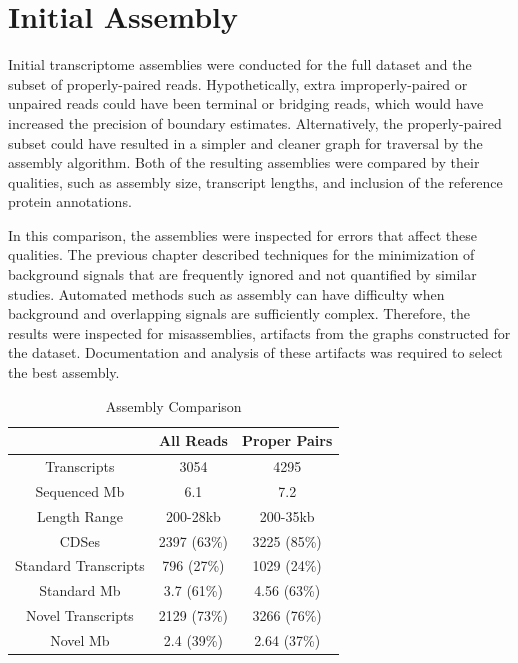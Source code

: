 
\section{Initial Assembly}


Initial transcriptome assemblies were conducted for the full dataset and the subset of properly-paired reads. Hypothetically, extra improperly-paired or unpaired reads could have been terminal or bridging reads, which would have increased the precision of boundary estimates. Alternatively, the properly-paired subset could have resulted in a simpler and cleaner graph for traversal by the assembly algorithm. Both of the resulting assemblies were compared by their qualities, such as assembly size, transcript lengths, and inclusion of the reference protein annotations. 

In this comparison, the assemblies were inspected for errors that affect these qualities. The previous chapter described techniques for the minimization of background signals that are frequently ignored and not quantified by similar studies. Automated methods such as assembly can have difficulty when background and overlapping signals are sufficiently complex. Therefore, the results were inspected for misassemblies, artifacts from the graphs constructed for the dataset. Documentation and analysis of these artifacts was required to select the best assembly.

\begin{table}
\caption{Assembly Comparison}\label{table:assemb_compare}
\begin{center}
\begin{tabular}{|c|c|c|}\hline
  & All Reads & Proper Pairs\\\hline\hline
Transcripts & 3054 & 4295\\\hline
Sequenced Mb & 6.1 & 7.2\\\hline
Length Range & 200-28kb & 200-35kb\\\hline
CDSes & 2397 (63\%) & 3225 (85\%)\\\hline
Standard Transcripts & 796 (27\%) & 1029 (24\%)\\\hline
Standard Mb & 3.7 (61\%) & 4.56 (63\%)\\\hline
Novel Transcripts & 2129 (73\%) & 3266 (76\%)\\\hline
Novel Mb & 2.4 (39\%)& 2.64 (37\%)\\\hline
\end{tabular}
\end{center}
\end{table}

